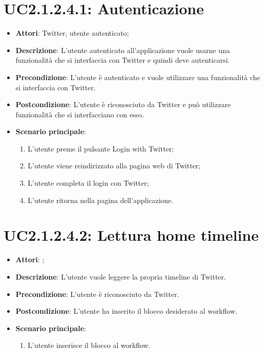 \section{UC2.1.2.4.1: Autenticazione}
\label{UC2.1.2.4.1}
\begin{itemize}
	\item \textbf{Attori}: Twitter, utente autenticato;
	\item \textbf{Descrizione}: L'utente autenticato all'applicazione vuole usarne una funzionalità che si interfaccia con Twitter e quindi deve autenticarsi. 
	\item \textbf{Precondizione}: L'utente è autenticato e vuole utilizzare una funzionalità che si interfaccia con Twitter.
	\item \textbf{Postcondizione}: L'utente è riconosciuto da Twitter e può utilizzare funzionalità che si interfacciano con esso.
	\item \textbf{Scenario principale}:
	\begin{enumerate} \item L'utente preme il pulsante Login with Twitter;  \item  L'utente viene reindirizzato alla pagina web di Twitter;  \item  L'utente completa il login con Twitter;  \item  L'utente ritorna nella pagina dell'applicazione.\end{enumerate}
\end{itemize}

\section{UC2.1.2.4.2: Lettura home timeline}
\label{UC2.1.2.4.2}
\begin{itemize}
	\item \textbf{Attori}: ;
	\item \textbf{Descrizione}: L'utente vuole leggere la propria timeline di Twitter.
	\item \textbf{Precondizione}: L'utente è riconosciuto da Twitter.
	\item \textbf{Postcondizione}: L'utente ha inserito il blocco desiderato al workflow.
	\item \textbf{Scenario principale}:
	\begin{enumerate} \item L'utente inserisce il blocco al workflow.\end{enumerate}
\end{itemize}

